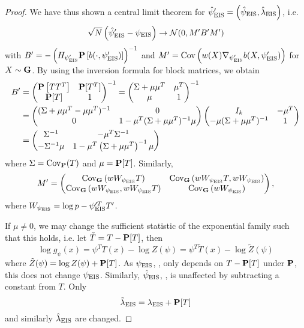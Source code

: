 \begin{proof}
    We have thus shown a central limit theorem for $\hat\psi'_{\eis} = \left( \hpeis, \hat\lambda_{\eis} \right)$, i.e. 
    $$
        \sqrt{N} \left( \hat\psi'_{\eis} - \peis \right) \to \mathcal N(0, M'B'M')
    $$
    with $B' = - \left(H_{\psi'_{\eis}} \P \left[ b(\cdot, \psi'_{\eis}) \right]\right)^{-1}$ and $M' = \cov \left( w(X) \nabla_{\psi'_{\eis}} b(X,\psi'_{\eis}) \right)$ for $X \sim \G$. By using the inversion formula for block matrices, we obtain 
    \begin{align*}
        B' &= \begin{pmatrix}
            \P \left[ TT^{T} \right] & \P [T^{T}] \\
            \P [T] & 1
        \end{pmatrix}^{-1} = \begin{pmatrix}
            \Sigma + \mu\mu^{T} & \mu^{T} \\
            \mu & 1
        \end{pmatrix}^{-1} \\
        &= \begin{pmatrix}
            (\Sigma + \mu\mu^{T} - \mu\mu^{T})^{-1} & 0 \\
            0 & 1 - \mu^{T} (\Sigma + \mu\mu^{T})^{-1}\mu
        \end{pmatrix} \begin{pmatrix}
            I_{k} & - \mu^{T} \\
            -\mu(\Sigma + \mu\mu^{T})^{-1}& 1
        \end{pmatrix} \\
        &= \begin{pmatrix}
            \Sigma^{-1} & - \mu^{T}\Sigma^{-1}\\
            -\Sigma^{-1}\mu& 1 - \mu^{T} \left( \Sigma + \mu\mu^{T} \right)^{-1}\mu
        \end{pmatrix}
    \end{align*}
    where $\Sigma = \cov_{\P} (T)$ and $\mu = \P [T]$. Similarly, 
    $$
        M' = \begin{pmatrix}
            \cov_{\G} \left( w W_{\peis}T \right) &\cov_{\G} \left( w W_{\peis}T, w W_{\peis} \right) \\
            \cov_{\G} \left( w W_{\peis}, w W_{\peis}T \right) & \cov_{\G} \left( w W_{\peis} \right) 
        \end{pmatrix},
    $$
    where $W_{\peis} = \log p - \psi^{\prime T}_{\eis}T'$.

    If $\mu \neq 0$, we may change the sufficient statistic of the exponential family such that this holds, i.e. let $\tilde T = T - \P [T]$, then 
    $$
        \log g_{\psi}(x) = \psi^{T}T(x) - \log Z(\psi) = \psi^{T}\tilde T(x) - \log \tilde Z(\psi)
    $$
    where $\tilde Z(\psi) = \log Z(\psi) + \P [T]$. As $\peis$, , only depends on $T - \P[T]$ under $\P$, this does not change $\peis$. Similarly, $\hpeis$, , is unaffected by subtracting a constant from $T$. Only 
    $$
        \tilde \lambda_{\eis} = \lambda_{\eis} + \P[T]
    $$
    and similarly $\hat\lambda_{\eis}$ are changed.
    

\end{proof}

